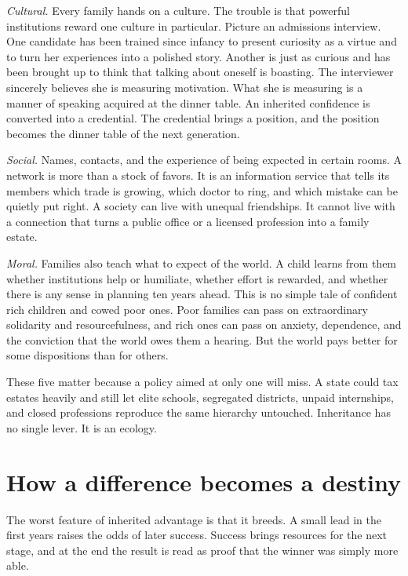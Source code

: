 \documentclass[12pt,a4paper]{book}
\begin{document}
\emph{Cultural.} Every family hands on a culture. The trouble is that powerful institutions reward one culture in particular. Picture an admissions interview. One candidate has been trained since infancy to present curiosity as a virtue and to turn her experiences into a polished story. Another is just as curious and has been brought up to think that talking about oneself is boasting. The interviewer sincerely believes she is measuring motivation. What she is measuring is a manner of speaking acquired at the dinner table. An inherited confidence is converted into a credential. The credential brings a position, and the position becomes the dinner table of the next generation.

\emph{Social.} Names, contacts, and the experience of being expected in certain rooms. A network is more than a stock of favors. It is an information service that tells its members which trade is growing, which doctor to ring, and which mistake can be quietly put right. A society can live with unequal friendships. It cannot live with a connection that turns a public office or a licensed profession into a family estate.

\emph{Moral.} Families also teach what to expect of the world. A child learns from them whether institutions help or humiliate, whether effort is rewarded, and whether there is any sense in planning ten years ahead. This is no simple tale of confident rich children and cowed poor ones. Poor families can pass on extraordinary solidarity and resourcefulness, and rich ones can pass on anxiety, dependence, and the conviction that the world owes them a hearing. But the world pays better for some dispositions than for others.

These five matter because a policy aimed at only one will miss. A state could tax estates heavily and still let elite schools, segregated districts, unpaid internships, and closed professions reproduce the same hierarchy untouched. Inheritance has no single lever. It is an ecology.

\section{How a difference becomes a destiny}

The worst feature of inherited advantage is that it breeds. A small lead in the first years raises the odds of later success. Success brings resources for the next stage, and at the end the result is read as proof that the winner was simply more able.
\end{document}
